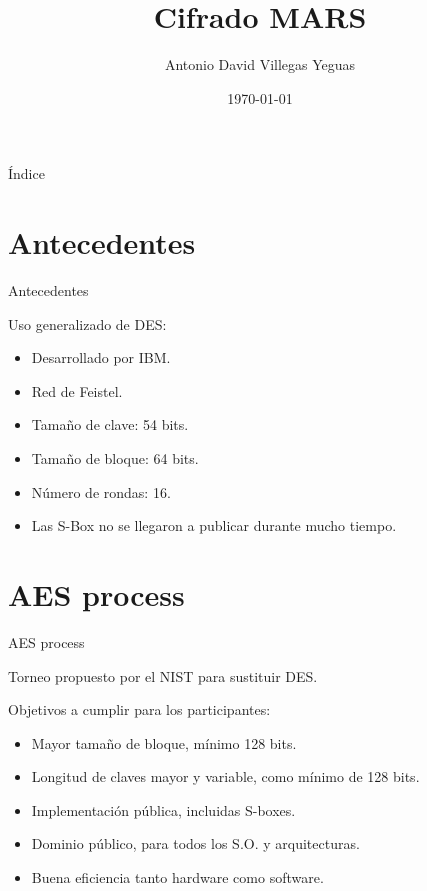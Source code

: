 \documentclass{beamer}
\title{Cifrado MARS}
\date{\today}
\author{Antonio David Villegas Yeguas}
\institute{Universidad de Granada\\
\medskip
\textit{advy99@correo.ugr.es}\\
\medskip
\url{https://github.com/advy99/CRIP}
\doclicenseThis
}
\begin{document}
 \maketitle

\begin{frame}{Índice}
\tableofcontents
\end{frame}




\section{Antecedentes}
\begin{frame}{Antecedentes}

	Uso generalizado de DES:

	\begin{itemize}
		\item Desarrollado por IBM.
		\item Red de Feistel.
		\item Tamaño de clave: 54 bits.
		\item Tamaño de bloque: 64 bits.
		\item Número de rondas: 16.
		\item Las S-Box no se llegaron a publicar durante mucho tiempo.
	\end{itemize}

\end{frame}


\section{AES process}
\begin{frame}{AES process}

	Torneo propuesto por el NIST para sustituir DES.

	Objetivos a cumplir para los participantes:

	\begin{itemize}
		\item Mayor tamaño de bloque, mínimo 128 bits.
		\item Longitud de claves mayor y variable, como mínimo de 128 bits.
		\item Implementación pública, incluidas S-boxes.
		\item Dominio público, para todos los S.O. y arquitecturas.
		\item Buena eficiencia tanto hardware como software.
	\end{itemize}

\end{frame}
\end{document}
